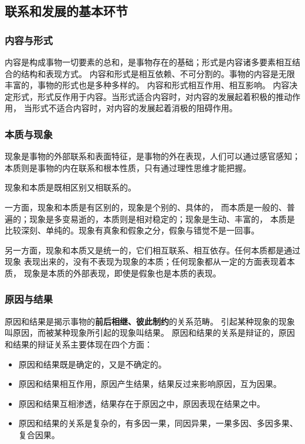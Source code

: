 \documentclass[11pt, UTF8]{book} %
\begin{document}
\subsection{联系和发展的基本环节}

\subsubsection{内容与形式}

内容是构成事物一切要素的总和，是事物存在的基础；形式是内容诸多要素相互结合的结构和表现方式。
内容和形式是相互依赖、不可分割的。事物的内容是无限丰富的，事物的形式也是多种多样的。
内容和形式相互作用、相互影响。
内容决定形式，形式反作用于内容。当形式适合内容时，对内容的发展起着积极的推动作用，
当形式不适合内容时，对内容的发展起着消极的阻碍作用。

\subsubsection{本质与现象}

现象是事物的外部联系和表面特征，是事物的外在表现，人们可以通过感官感知；
本质则是事物的内在联系和根本性质，只有通过理性思维才能把握。

现象和本质是既相区别又相联系的。

一方面，现象和本质是有区别的，现象是个别的、具体的，
而本质是一般的、普遍的；现象是多变易逝的，本质则是相对稳定的；现象是生动、丰富的，
本质是比较深刻、单纯的。现象有真象和假象之分，假象与错觉不是一回事。

另一方面，现象和本质又是统一的，它们相互联系、相互依存。任何本质都是通过现象
表现出来的，没有不表现为现象的本质；任何现象都从一定的方面表现着本质，
现象是本质的外部表现，即使是假象也是本质的表现。

\subsubsection{原因与结果}

原因和结果是揭示事物的\textbf{前后相继、彼此制约}的关系范畴。
引起某种现象的现象叫原因，而被某种现象所引起的现象叫结果。
原因和结果的关系是辩证的，原因和结果的辩证关系主要体现在四个方面：
\begin{itemize}[itemsep=0pt]
    \item 原因和结果既是确定的，又是不确定的。
    \item 原因和结果相互作用，原因产生结果，结果反过来影响原因，互为因果。
    \item 原因和结果互相渗透，结果存在于原因之中，原因表现在结果之中。
    \item 原因和结果的关系是复杂的，有多因一果，同因异果，一果多因、多因多果、
        复合因果。
\end{itemize}
\end{document}
